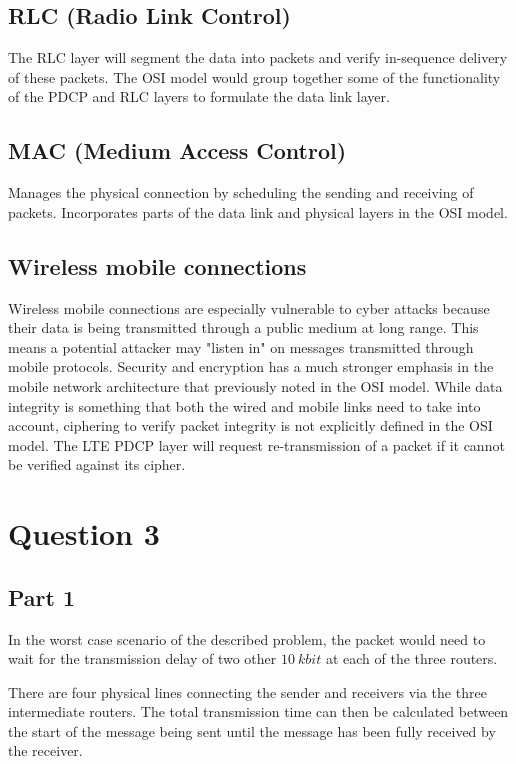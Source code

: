 \documentclass[12pt,letterpaper]{article}
\begin{document}
\subsection*{RLC (Radio Link Control)}
The RLC layer will segment the data into packets and verify in-sequence delivery
of these packets. The OSI model would group together some of the functionality of
the PDCP and RLC layers to formulate the data link layer.

\subsection*{MAC (Medium Access Control)}
Manages the physical connection by scheduling the sending and receiving of
packets. Incorporates parts of the data link and physical layers in the OSI model.

\subsection*{Wireless mobile connections}
Wireless mobile connections are especially vulnerable to cyber attacks because their
data is being transmitted through a public medium at long range. This means a potential
attacker may "listen in" on messages transmitted through mobile protocols. Security and
encryption has a much stronger emphasis in the mobile network architecture that previously
noted in the OSI model. While data integrity is something that both the wired and mobile
links need to take into account, ciphering to verify packet integrity is not explicitly
defined in the OSI model. The LTE PDCP layer will request re-transmission of a packet if
it cannot be verified against its cipher.

\section*{Question 3}
\subsection*{Part 1}
In the worst case scenario of the described problem, the packet would need to wait
for the transmission delay of two other $\SI{10}{kbit}$ at each of the three
routers.

There are four physical lines connecting the sender and receivers via the three
intermediate routers. The total transmission time can then be calculated between
the start of the message being sent until the message has been fully received by
the receiver.
\end{document}
